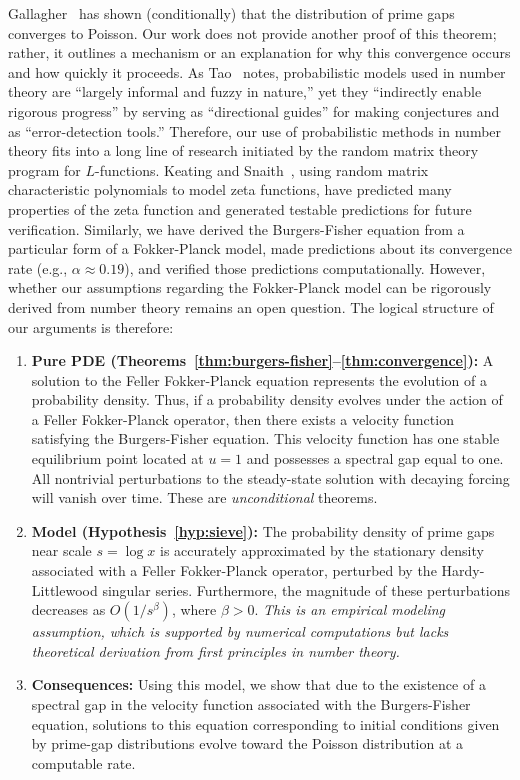 \documentclass[11pt, a4paper]{amsart}
\theoremstyle{plain}
\theoremstyle{definition}
\begin{document}
Gallagher~\cite{Gallagher1976} has shown (conditionally) that the distribution of prime gaps converges to Poisson. Our work does not 
provide another proof of this theorem; rather, it outlines a mechanism or an explanation for why this convergence occurs and how quickly it proceeds. 
As Tao~\cite{Tao2015} notes, probabilistic models used in number theory are ``largely informal and fuzzy in nature,'' yet 
they ``indirectly enable rigorous progress'' by serving as ``directional guides'' for making conjectures and as ``error-detection tools.'' 
Therefore, our use of probabilistic methods in number theory fits into a long line of research initiated by the random matrix theory program 
for $L$-functions. Keating and Snaith~\cite{KS2000}, using random matrix characteristic polynomials to model zeta functions, 
have predicted many properties of the zeta function and generated testable predictions for future verification. Similarly, we have derived the 
Burgers-Fisher equation from a particular form of a Fokker-Planck model, made predictions about its convergence rate (e.g., $\alpha \approx 0.19$), 
and verified those predictions computationally. However, whether our assumptions regarding the Fokker-Planck model can be rigorously derived 
from number theory remains an open question. The logical structure of our arguments is therefore:

\begin{enumerate}
\item \textbf{Pure PDE (Theorems~\ref{thm:burgers-fisher}--\ref{thm:convergence}):} A solution to the Feller Fokker-Planck equation represents the 
evolution of a probability density. Thus, if a probability density evolves under the action of a Feller Fokker-Planck operator, then there exists a 
velocity function satisfying the Burgers-Fisher equation. This velocity function has one stable equilibrium point located at $u=1$ and possesses a 
spectral gap equal to one. All nontrivial perturbations to the steady-state solution with decaying forcing will vanish over time. These are \emph{unconditional} theorems.
\item \textbf{Model (Hypothesis~\ref{hyp:sieve}):} The probability density of prime gaps near scale $s=\log x$ is accurately approximated by the 
stationary density associated with a Feller Fokker-Planck operator, perturbed by the Hardy-Littlewood singular series. Furthermore, the magnitude of 
these perturbations decreases as $O(1/s^{\beta})$, where $\beta > 0$. \emph{This is an empirical modeling assumption, which is supported by numerical 
computations but lacks theoretical derivation from first principles in number theory.}
\item \textbf{Consequences:} Using this model, we show that due to the existence of a spectral gap in the velocity function associated with the 
Burgers-Fisher equation, solutions to this equation corresponding to initial conditions given by prime-gap distributions evolve toward the Poisson distribution at a computable rate.
\end{enumerate}
\end{document}

